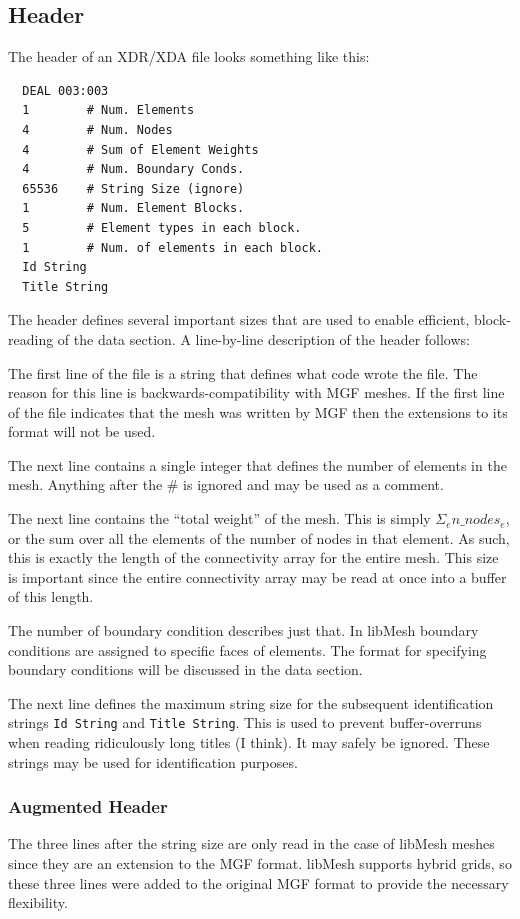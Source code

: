 \documentclass[12pt]{article}
\begin{document}
\subsection{Header}
The header of an XDR/XDA file looks something like this:
\small
\begin{verbatim}
  DEAL 003:003
  1        # Num. Elements
  4        # Num. Nodes
  4        # Sum of Element Weights
  4        # Num. Boundary Conds.
  65536    # String Size (ignore)
  1        # Num. Element Blocks.
  5        # Element types in each block.
  1        # Num. of elements in each block.
  Id String
  Title String
\end{verbatim}
\normalsize
The header defines several important sizes that are used to enable efficient, block-reading of the data section. A line-by-line description of the header follows:

The first line of the file is a string that defines what code wrote the file.  The reason for this line is backwards-compatibility with MGF meshes.  If the first line of the file indicates that the mesh was written by MGF then the extensions to its format will not be used.

The next line contains a single integer that defines the number of elements in the mesh.  Anything after the \# is ignored and may be used as a comment.

The next line contains the ``total weight'' of the mesh.  This is simply $\Sigma_e n\_nodes_e$, or the sum over all the elements of the number of nodes in that element.  As such, this is exactly the length of the connectivity array for the entire mesh.  This size is important since the entire connectivity array may be read at once into a buffer of this length.

The number of boundary condition describes just that.  In libMesh boundary conditions are assigned to specific faces of elements.  The format for specifying boundary conditions will be discussed in the data section.

The next line defines the maximum string size for the subsequent identification strings \texttt{Id~String} and \texttt{Title~String}. This is used to prevent buffer-overruns when reading ridiculously long titles (I think).  It may safely be ignored.  These strings may be used for identification purposes.

\subsubsection{Augmented Header}
The three lines after the string size are only read in the case of libMesh meshes since they are an extension to the MGF format.  libMesh supports hybrid grids, so these three lines were added to the original MGF format to provide the necessary flexibility.
\end{document}
